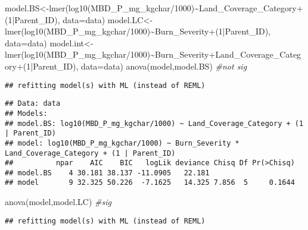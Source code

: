 \documentclass[
]{article}
\newenvironment{Shaded}{\begin{snugshade}}{\end{snugshade}}
\newcommand{\AttributeTok}[1]{\textcolor[rgb]{0.77,0.63,0.00}{#1}}
\newcommand{\CommentTok}[1]{\textcolor[rgb]{0.56,0.35,0.01}{\textit{#1}}}
\newcommand{\DecValTok}[1]{\textcolor[rgb]{0.00,0.00,0.81}{#1}}
\newcommand{\FunctionTok}[1]{\textcolor[rgb]{0.00,0.00,0.00}{#1}}
\newcommand{\NormalTok}[1]{#1}
\newcommand{\OtherTok}[1]{\textcolor[rgb]{0.56,0.35,0.01}{#1}}
\newcommand{\SpecialCharTok}[1]{\textcolor[rgb]{0.00,0.00,0.00}{#1}}
\begin{document}
\begin{Shaded}
\begin{Highlighting}[]
\NormalTok{model.BS}\OtherTok{\textless{}{-}}\FunctionTok{lmer}\NormalTok{(}\FunctionTok{log10}\NormalTok{(MBD\_P\_mg\_kgchar}\SpecialCharTok{/}\DecValTok{1000}\NormalTok{)}\SpecialCharTok{\textasciitilde{}}\NormalTok{Land\_Coverage\_Category}\SpecialCharTok{+}\NormalTok{(}\DecValTok{1}\SpecialCharTok{|}\NormalTok{Parent\_ID), }\AttributeTok{data=}\NormalTok{data)}
\NormalTok{model.LC}\OtherTok{\textless{}{-}}\FunctionTok{lmer}\NormalTok{(}\FunctionTok{log10}\NormalTok{(MBD\_P\_mg\_kgchar}\SpecialCharTok{/}\DecValTok{1000}\NormalTok{)}\SpecialCharTok{\textasciitilde{}}\NormalTok{Burn\_Severity}\SpecialCharTok{+}\NormalTok{(}\DecValTok{1}\SpecialCharTok{|}\NormalTok{Parent\_ID), }\AttributeTok{data=}\NormalTok{data)}
\NormalTok{model.int}\OtherTok{\textless{}{-}}\FunctionTok{lmer}\NormalTok{(}\FunctionTok{log10}\NormalTok{(MBD\_P\_mg\_kgchar}\SpecialCharTok{/}\DecValTok{1000}\NormalTok{)}\SpecialCharTok{\textasciitilde{}}\NormalTok{Burn\_Severity}\SpecialCharTok{+}\NormalTok{Land\_Coverage\_Category}\SpecialCharTok{+}\NormalTok{(}\DecValTok{1}\SpecialCharTok{|}\NormalTok{Parent\_ID), }\AttributeTok{data=}\NormalTok{data)}
\FunctionTok{anova}\NormalTok{(model,model.BS) }\CommentTok{\#not sig}
\end{Highlighting}
\end{Shaded}

\begin{verbatim}
## refitting model(s) with ML (instead of REML)
\end{verbatim}

\begin{verbatim}
## Data: data
## Models:
## model.BS: log10(MBD_P_mg_kgchar/1000) ~ Land_Coverage_Category + (1 | Parent_ID)
## model: log10(MBD_P_mg_kgchar/1000) ~ Burn_Severity * Land_Coverage_Category + (1 | Parent_ID)
##          npar    AIC    BIC   logLik deviance Chisq Df Pr(>Chisq)
## model.BS    4 30.181 38.137 -11.0905   22.181                    
## model       9 32.325 50.226  -7.1625   14.325 7.856  5     0.1644
\end{verbatim}

\begin{Shaded}
\begin{Highlighting}[]
\FunctionTok{anova}\NormalTok{(model,model.LC) }\CommentTok{\#sig}
\end{Highlighting}
\end{Shaded}

\begin{verbatim}
## refitting model(s) with ML (instead of REML)
\end{verbatim}
\end{document}

